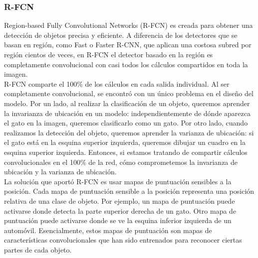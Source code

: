 \documentclass{bmvc2k}
\begin{document}
\subsubsection{R-FCN}

Region-based Fully Convolutional Networks (R-FCN) es creada para obtener una detección de objetos precisa y eficiente. A diferencia de los detectores que se basan ​​en región, como Fast o Faster R-CNN, que aplican una costosa subred por región cientos de veces, en R-FCN el detector basado en la región es completamente convolucional con casi todos los cálculos compartidos en toda la imagen.\\

R-FCN comparte el 100\% de los cálculos en cada salida individual. Al ser completamente convolucional, se encontró con un único problema en el diseño del modelo. Por un lado, al realizar la clasificación de un objeto, queremos aprender la invarianza de ubicación en un modelo: independientemente de dónde aparezca el gato en la imagen, queremos clasificarlo como un gato. Por otro lado, cuando realizamos la detección del objeto, queremos aprender la varianza de ubicación: si el gato está en la esquina superior izquierda, queremos dibujar un cuadro en la esquina superior izquierda. Entonces, si estamos tratando de compartir cálculos convolucionales en el 100\% de la red, cómo comprometemos la invarianza de ubicación y la varianza de ubicación.\\

La solución que aportó R-FCN es usar mapas de puntuación sensibles a la posición. Cada mapa de puntuación sensible a la posición representa una posición relativa de una clase de objeto. Por ejemplo, un mapa de puntuación puede activarse donde detecta la parte superior derecha de un gato. Otro mapa de puntuación puede activarse donde se ve la esquina inferior izquierda de un automóvil. Esencialmente, estos mapas de puntuación son mapas de características convolucionales que han sido entrenados para reconocer ciertas partes de cada objeto.\\
\end{document}
